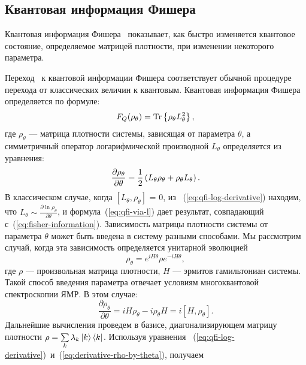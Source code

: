 \subsection{Квантовая информация Фишера}
\label{sec:quantum-fisher-information}
\begin{definition}\label{def:quantum-fisher-information}
  Квантовая информация Фишера~\cite{liu2014} показывает,
  как быстро изменяется квантовое состояние,
  определяемое матрицей плотности, при изменении некоторого параметра.
\end{definition}
Переход~\cite{Luo2003pamc} к квантовой информации Фишера соответствует обычной процедуре перехода от классических величин к квантовым.
Квантовая информация Фишера определяется по формуле:
%
\begin{equation}\label{eq:qfi-via-l}
  F_Q (\rho_\theta) = \mathrm{Tr} \left\{ \rho_\theta L^2_\theta \right\},
\end{equation}
%
где $\rho_\theta$ ---  матрица плотности системы, зависящая от параметра $\theta$, а симметричный оператор логарифмической производной $L_\theta$ определяется из уравнения:
%
\begin{equation}\label{eq:qfi-log-derivative}
  \frac{\partial\rho_\theta}{\partial\theta}
  = \frac{1}{2} \left( L_\theta \rho_\theta + \rho_\theta L_\theta \right).
\end{equation}
%
В классическом случае, когда $\left[L_\theta, \rho_\theta \right]$ = 0, из ~(\ref{eq:qfi-log-derivative}) находим,
что ${L_\theta\sim\frac{\partial\ln\rho_\theta}{\partial\theta}}$,
и формула~(\ref{eq:qfi-via-l}) дает результат, совпадающий с~(\ref{eq:fisher-information}).
%
Зависимость матрицы плотности системы от параметра $\theta$ может быть введена в систему разными способами.
Мы рассмотрим случай, когда эта зависимость определяется унитарной эволюцией
%
\begin{equation}%
  \rho_\theta = e^{i H \theta} \rho e^{-i H \theta},
\end{equation}
%
где $\rho$ --- произвольная матрица плотности, $H$ --- эрмитов гамильтониан системы.
Такой способ введения параметра отвечает условиям многоквантовой спектроскопии ЯМР.
В этом случае:
%
\begin{equation}\label{eq:derivative-rho-by-theta}
  \frac{\partial\rho_\theta}{\partial\theta}
  = iH\rho_\theta - i\rho_\theta H
  = i \left[H,\rho_\theta \right].
\end{equation}
%
Дальнейшие вычисления проведем в базисе, диагонализирующем матрицу плотности
$\rho =\sum\limits_{k} \lambda_k \left| k \right\rangle\left\langle k \right|$.
Используя уравнения ~(\ref{eq:qfi-log-derivative})~и~(\ref{eq:derivative-rho-by-theta}), получаем
